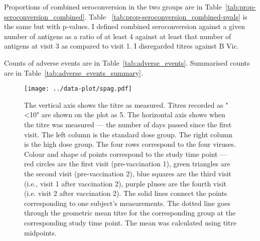 \documentclass[11pt]{article}
\begin{document}
Proportions of combined seroconversion
in the two groups are in
Table~\ref{tab:prop-seroconversion_combined}.
Table ~\ref{tab:prop-seroconversion_combined-pvals}
is the same but with p-values.
I defined combined seroconversion against a given number of antigens
as a ratio of at least 4
against at least that number of antigens at visit 3 as compared to visit 1.
I disregarded titres against B Vic.

Counts of adverse events are in Table~\ref{tab:adverse_events}. Summarised
counts are in Table~\ref{tab:adverse_events_summary}.


































\begin{figure}[htp]
    \centering
    \texttt{[image: ../data-plot/spag.pdf]}
    \caption{
        The vertical axis shows the titre as measured.
        Titres recorded as "<10" are shown on the plot as 5.
        The horizontal axis shows when the titre was measured --- the number of
        days passed since the first visit.
        The left column is the standard dose group.
        The right column is the high dose group.
        The four rows correspond to the four viruses.
        Colour and shape of points correspond to the study time point ---
        red circles are the first visit (pre-vaccination 1),
        green triangles are the second visit (pre-vaccination 2),
        blue squares are the third visit (i.e., visit 1 after vaccination 2),
        purple pluses are the fourth visit (i.e. visit 2 after vaccination 2).
        The solid lines connect the points
        corresponding to one subject's measurements.
        The dotted line goes through the geometric mean titre for the
        corresponding group at the corresponding study time point. The mean was
        calculated using titre midpoints.
    }
    \label{fig:spag}
\end{figure}
\end{document}
